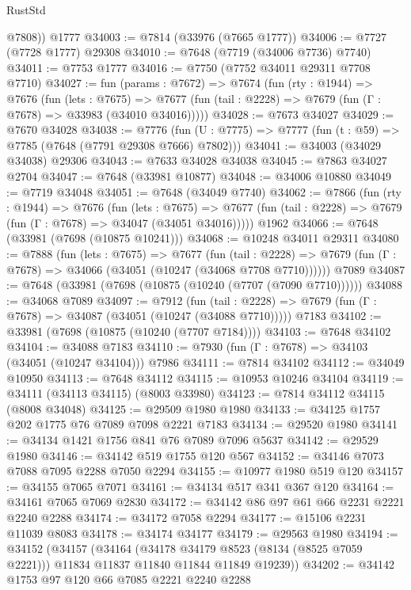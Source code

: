 \begin{lexlean}{RustStd}
\begin{coremodule}
{\begin{coremodule}
{{{{{{{{{{{{{{{{{{{{{{{{{{{{{{{{{{{{{{{{{{{{{{{{{{{{{        @7808))
    @1777
@34003 := @7814 (@33976 (@7665 @1777))
@34006 := @7727 (@7728 @1777) @29308
@34010 := @7648 (@7719 (@34006 @7736) @7740)
@34011 := @7753 @1777
@34016 := @7750 (@7752 @34011 @29311 @7708 @7710)
@34027 := fun (params : @7672) =>
  @7674
    (fun (rty : @1944) =>
    @7676
      (fun (lets : @7675) =>
      @7677 (fun (tail : @2228) => @7679 (fun (Γ : @7678) => @33983 (@34010 @34016)))))
@34028 := @7673 @34027
@34029 := @7670 @34028
@34038 := @7776
    (fun (U : @7775) => @7777 (fun (t : @59) => @7785 (@7648 (@7791 @29308 @7666) @7802)))
@34041 := @34003 (@34029 @34038) @29306
@34043 := @7633 @34028 @34038
@34045 := @7863 @34027 @2704
@34047 := @7648 (@33981 @10877)
@34048 := @34006 @10880
@34049 := @7719 @34048
@34051 := @7648 (@34049 @7740)
@34062 := @7866
    (fun (rty : @1944) =>
    @7676
      (fun (lets : @7675) =>
      @7677 (fun (tail : @2228) => @7679 (fun (Γ : @7678) => @34047 (@34051 @34016)))))
    @1962
@34066 := @7648 (@33981 (@7698 (@10875 @10241)))
@34068 := @10248 @34011 @29311
@34080 := @7888
    (fun (lets : @7675) =>
    @7677
      (fun (tail : @2228) =>
      @7679 (fun (Γ : @7678) => @34066 (@34051 (@10247 (@34068 @7708 @7710))))))
    @7089
@34087 := @7648 (@33981 (@7698 (@10875 (@10240 (@7707 (@7090 @7710))))))
@34088 := @34068 @7089
@34097 := @7912
    (fun (tail : @2228) => @7679 (fun (Γ : @7678) => @34087 (@34051 (@10247 (@34088 @7710)))))
    @7183
@34102 := @33981 (@7698 (@10875 (@10240 (@7707 @7184))))
@34103 := @7648 @34102
@34104 := @34088 @7183
@34110 := @7930 (fun (Γ : @7678) => @34103 (@34051 (@10247 @34104))) @7986
@34111 := @7814 @34102
@34112 := @34049 @10950
@34113 := @7648 @34112
@34115 := @10953 @10246 @34104
@34119 := @34111 (@34113 @34115) (@8003 @33980)
@34123 := @7814 @34112 @34115 (@8008 @34048)
@34125 := @29509 @1980 @1980
@34133 := @34125 @1757 @202 @1775 @76 @7089 @7098 @2221 @7183
@34134 := @29520 @1980
@34141 := @34134 @1421 @1756 @841 @76 @7089 @7096 @5637
@34142 := @29529 @1980
@34146 := @34142 @519 @1755 @120 @567
@34152 := @34146 @7073 @7088 @7095 @2288 @7050 @2294
@34155 := @10977 @1980 @519 @120
@34157 := @34155 @7065 @7071
@34161 := @34134 @517 @341 @367 @120
@34164 := @34161 @7065 @7069 @2830
@34172 := @34142 @86 @97 @61 @66 @2231 @2221 @2240 @2288
@34174 := @34172 @7058 @2294
@34177 := @15106 @2231 @11039 @8083
@34178 := @34174 @34177
@34179 := @29563 @1980
@34194 := @34152
    (@34157
      (@34164
        (@34178 @34179 @8523 (@8134 (@8525 @7059 @2221)))
        @11834
        @11837
        @11840
        @11844
        @11849
        @19239))
@34202 := @34142 @1753 @97 @120 @66 @7085 @2221 @2240 @2288
}}}}}}}}}}}}}}}}}}}}}}}}}}}}}}}}}}}}}}}}}}}}}}}}}}}}}
\end{coremodule}}
\end{coremodule}
\end{lexlean}
